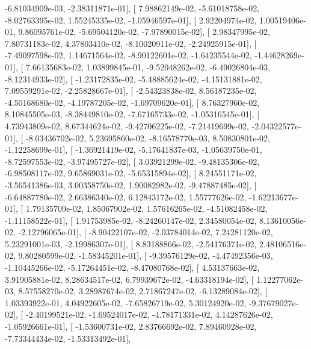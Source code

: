 \documentclass{article}
\begin{document}
         -6.81034909e-03,  -2.38311871e-01],
       [  7.98862149e-02,  -5.61018758e-02,  -8.02763395e-02,
          1.55245335e-02,  -1.05946597e-01],
       [  2.92204974e-02,   1.00519406e-01,   9.86095761e-02,
         -5.69504120e-02,  -7.97890015e-02],
       [  2.98347995e-02,   7.80731183e-02,   4.37803410e-02,
         -8.10020911e-02,  -2.24925915e-01],
       [ -7.49097598e-02,   1.14671564e-02,  -8.90122601e-02,
         -1.64235544e-02,  -1.44628269e-01],
       [  7.66135683e-02,   1.03899845e-01,  -9.52048262e-02,
         -6.49026804e-03,  -8.12314933e-02],
       [ -1.23172835e-02,  -5.48885624e-02,  -4.15131881e-02,
          7.09559291e-02,  -2.25828667e-01],
       [ -2.54323838e-02,   8.56187235e-02,  -4.50168680e-02,
         -4.19787205e-02,  -1.69709620e-01],
       [  8.76327960e-02,   8.10845505e-03,  -8.38449810e-02,
         -7.67165733e-02,  -1.05316545e-01],
       [  4.73943809e-02,   8.67344624e-02,  -9.42706225e-02,
         -7.21419699e-02,  -2.04322577e-01],
       [ -8.03436702e-02,   5.23695860e-02,  -8.16578770e-03,
          8.50830801e-02,  -1.12258699e-01],
       [ -1.36921419e-02,  -5.17641837e-03,  -1.05639750e-01,
         -8.72597553e-02,  -3.97495727e-02],
       [  3.03921299e-02,  -9.48135306e-02,  -6.98508117e-02,
          9.65869031e-02,  -5.65315894e-02],
       [  8.24551171e-02,  -3.56541386e-03,   3.00358750e-02,
          1.90082982e-02,  -9.47887485e-02],
       [ -6.64887780e-02,   2.66386340e-02,   6.12843172e-02,
          1.55777626e-02,  -1.62213677e-01],
       [  1.79135709e-02,   1.85067902e-02,   1.57616265e-02,
         -4.51082458e-02,  -1.11158522e-01],
       [  1.91753985e-02,  -8.24260147e-02,   2.34580054e-02,
          8.13610056e-02,  -2.12796065e-01],
       [ -8.90422107e-02,  -2.03784014e-02,   7.24281120e-02,
          5.23291001e-03,  -2.19986307e-01],
       [  8.83188866e-02,  -2.54176371e-02,   2.48106516e-02,
          9.80280599e-02,  -1.58345201e-01],
       [ -9.39576129e-02,  -4.47492356e-03,  -1.10445266e-02,
         -5.17264451e-02,  -8.47080768e-02],
       [  4.53137663e-02,   3.91905881e-02,   8.28634517e-02,
          6.79939672e-02,  -4.63318194e-02],
       [  1.12277062e-03,   8.57558270e-02,   3.28987674e-02,
          2.71867247e-02,  -6.13289084e-02],
       [  1.03393922e-01,   4.04922605e-02,  -7.65826719e-02,
          5.30124920e-02,  -9.37679027e-02],
       [ -2.40199521e-02,  -1.69524017e-02,  -4.78171331e-02,
          4.14287626e-02,  -1.05926661e-01],
       [ -1.53600731e-02,   2.83766692e-02,   7.89460928e-02,
         -7.73344434e-02,  -1.53313492e-01],
\end{document}
